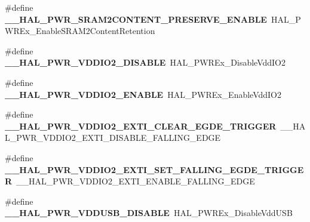 \begin{DoxyCompactItemize}
\mbox{\label{group___h_a_l___p_w_r___aliased___macros_ga6e94fe92e8c944021c1a82cc9ab4b977}} 
\#define {\bfseries \+\_\+\+\_\+\+H\+A\+L\+\_\+\+P\+W\+R\+\_\+\+S\+R\+A\+M2\+C\+O\+N\+T\+E\+N\+T\+\_\+\+P\+R\+E\+S\+E\+R\+V\+E\+\_\+\+E\+N\+A\+B\+LE}~H\+A\+L\+\_\+\+P\+W\+R\+Ex\+\_\+\+Enable\+S\+R\+A\+M2\+Content\+Retention
\item 
\mbox{\label{group___h_a_l___p_w_r___aliased___macros_ga61f85ad4cd0958d67c8cf027a1b67da5}} 
\#define {\bfseries \+\_\+\+\_\+\+H\+A\+L\+\_\+\+P\+W\+R\+\_\+\+V\+D\+D\+I\+O2\+\_\+\+D\+I\+S\+A\+B\+LE}~H\+A\+L\+\_\+\+P\+W\+R\+Ex\+\_\+\+Disable\+Vdd\+I\+O2
\item 
\mbox{\label{group___h_a_l___p_w_r___aliased___macros_ga0dabc2d8d35163d52c02fcbd04fd14a6}} 
\#define {\bfseries \+\_\+\+\_\+\+H\+A\+L\+\_\+\+P\+W\+R\+\_\+\+V\+D\+D\+I\+O2\+\_\+\+E\+N\+A\+B\+LE}~H\+A\+L\+\_\+\+P\+W\+R\+Ex\+\_\+\+Enable\+Vdd\+I\+O2
\item 
\mbox{\label{group___h_a_l___p_w_r___aliased___macros_ga93b3f07014857ba319c24a7e3e8b7ed0}} 
\#define {\bfseries \+\_\+\+\_\+\+H\+A\+L\+\_\+\+P\+W\+R\+\_\+\+V\+D\+D\+I\+O2\+\_\+\+E\+X\+T\+I\+\_\+\+C\+L\+E\+A\+R\+\_\+\+E\+G\+D\+E\+\_\+\+T\+R\+I\+G\+G\+ER}~\+\_\+\+\_\+\+H\+A\+L\+\_\+\+P\+W\+R\+\_\+\+V\+D\+D\+I\+O2\+\_\+\+E\+X\+T\+I\+\_\+\+D\+I\+S\+A\+B\+L\+E\+\_\+\+F\+A\+L\+L\+I\+N\+G\+\_\+\+E\+D\+GE
\item 
\mbox{\label{group___h_a_l___p_w_r___aliased___macros_gab5cb9dc5b115d7af7a361bf073af54b4}} 
\#define {\bfseries \+\_\+\+\_\+\+H\+A\+L\+\_\+\+P\+W\+R\+\_\+\+V\+D\+D\+I\+O2\+\_\+\+E\+X\+T\+I\+\_\+\+S\+E\+T\+\_\+\+F\+A\+L\+L\+I\+N\+G\+\_\+\+E\+G\+D\+E\+\_\+\+T\+R\+I\+G\+G\+ER}~\+\_\+\+\_\+\+H\+A\+L\+\_\+\+P\+W\+R\+\_\+\+V\+D\+D\+I\+O2\+\_\+\+E\+X\+T\+I\+\_\+\+E\+N\+A\+B\+L\+E\+\_\+\+F\+A\+L\+L\+I\+N\+G\+\_\+\+E\+D\+GE
\item 
\mbox{\label{group___h_a_l___p_w_r___aliased___macros_ga203b7ebde33c1eb9c99f0ac45fa521e7}} 
\#define {\bfseries \+\_\+\+\_\+\+H\+A\+L\+\_\+\+P\+W\+R\+\_\+\+V\+D\+D\+U\+S\+B\+\_\+\+D\+I\+S\+A\+B\+LE}~H\+A\+L\+\_\+\+P\+W\+R\+Ex\+\_\+\+Disable\+Vdd\+U\+SB

\end{DoxyCompactItemize}

